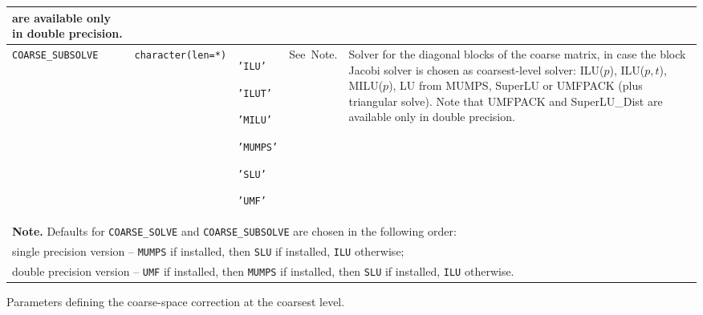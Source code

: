\begin{center}
\begin{tabular}{|p{3.9cm}|l|p{1.7cm}|p{1.7cm}|p{8.6cm}|}
                           are available only in double precision. \\ \hline
\verb|COARSE_SUBSOLVE| & \verb|character(len=*)|
                         & \texttt{'ILU'} \par \texttt{'ILUT'} \par \texttt{'MILU'} \par
                            \texttt{'MUMPS'} \par \texttt{'SLU'} \par \texttt{'UMF'} 
                         & See~Note.
                         & Solver for the diagonal blocks of the coarse matrix,
                           in case the block Jacobi solver
                           is chosen as coarsest-level solver: ILU($p$), ILU($p,t$),
                           MILU($p$), LU from MUMPS, SuperLU or UMFPACK 
                          (plus triangular solve).
                          Note that UMFPACK and SuperLU\_Dist
                          are available only in double precision. \\
\hline
\multicolumn{5}{|l|}{{\bfseries Note.} Defaults for \texttt{COARSE\_SOLVE} and 
\texttt{COARSE\_SUBSOLVE} are chosen in the following  order:} \\
\multicolumn{5}{|l|}{single precision version -- \texttt{MUMPS} if installed, 
                               then \texttt{SLU} if installed, 
                               \texttt{ILU} otherwise;}\\
\multicolumn{5}{|l|}{double precision version -- \texttt{UMF} if installed, 
                               then \texttt{MUMPS} if installed, then \texttt{SLU} if  
                               installed, \texttt{ILU} otherwise.}\\
\hline
\end{tabular}
\end{center}
\caption{Parameters defining the coarse-space correction at the coarsest
level.\label{tab:p_coarse}} 
\esideways

